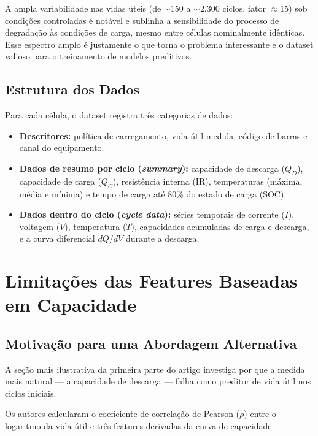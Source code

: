 \documentclass[12pt, a4paper]{article}
\begin{document}
A ampla variabilidade nas vidas úteis (de $\sim$150 a $\sim$2.300 ciclos,
fator $\approx$15) sob condições controladas é notável e sublinha a
sensibilidade do processo de degradação às condições de carga, mesmo entre
células nominalmente idênticas. Esse espectro amplo é justamente o que torna
o problema interessante e o dataset valioso para o treinamento de modelos
preditivos.

\subsection{Estrutura dos Dados}

Para cada célula, o dataset registra três categorias de dados:

\begin{itemize}
  \item \textbf{Descritores:} política de carregamento, vida útil medida,
  código de barras e canal do equipamento.

  \item \textbf{Dados de resumo por ciclo (\textit{summary}):} capacidade
  de descarga ($Q_D$), capacidade de carga ($Q_C$), resistência interna
  (IR), temperaturas (máxima, média e mínima) e tempo de carga até 80\%
  do estado de carga (SOC).

  \item \textbf{Dados dentro do ciclo (\textit{cycle data}):} séries
  temporais de corrente ($I$), voltagem ($V$), temperatura ($T$),
  capacidades acumuladas de carga e descarga, e a curva diferencial
  $dQ/dV$ durante a descarga.
\end{itemize}

\section{Limitações das Features Baseadas em Capacidade}

\subsection{Motivação para uma Abordagem Alternativa}

A seção mais ilustrativa da primeira parte do artigo investiga por que a
medida mais natural --- a capacidade de descarga --- falha como preditor de
vida útil nos ciclos iniciais.

Os autores calcularam o coeficiente de correlação de Pearson ($\rho$) entre
o logaritmo da vida útil e três features derivadas da curva de capacidade:
\end{document}
